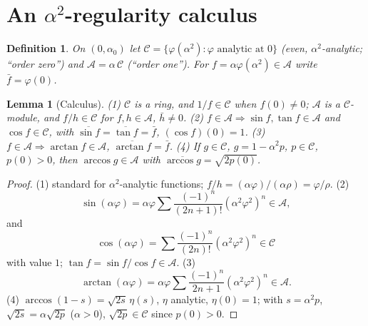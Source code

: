 \documentclass[pdflatex,sn-mathphys-num]{sn-jnl}
\theoremstyle{thmstyleone}%
\newtheorem{lemma}{Lemma}%
\theoremstyle{thmstyletwo}%
\theoremstyle{thmstylethree}%
\newtheorem{definition}{Definition}%
\begin{document}
\section{An \texorpdfstring{$\alpha^2$}{alpha2}-regularity calculus}
\begin{definition}
On $(0,\alpha_0)$ let $\mathcal C=\{\varphi(\alpha^2):\varphi\text{ analytic at }0\}$
(even, $\alpha^2$-analytic; ``order zero'') and $\mathcal A=\alpha\,\mathcal C$
(``order one''). For $f=\alpha\varphi(\alpha^2)\in\mathcal A$ write $\bar f=\varphi(0)$.
\end{definition}

\begin{lemma}[Calculus]\label{lem:calc}
\textup{(1)} $\mathcal C$ is a ring, and $1/f\in\mathcal C$ when $f(0)\neq0$;
$\mathcal A$ is a $\mathcal C$-module, and $f/h\in\mathcal C$ for $f,h\in\mathcal A$, $\bar h\neq0$.
\textup{(2)} $f\in\mathcal A\Rightarrow\sin f,\tan f\in\mathcal A$ and
$\cos f\in\mathcal C$, with $\overline{\sin f}=\overline{\tan f}=\bar f$,
$(\cos f)(0)=1$.
\textup{(3)} $f\in\mathcal A\Rightarrow\arctan f\in\mathcal A$,
$\overline{\arctan f}=\bar f$.
\textup{(4)} If $g\in\mathcal C$, $g=1-\alpha^2p$, $p\in\mathcal C$, $p(0)>0$, then $\arccos g\in\mathcal A$ with $\overline{\arccos g}=\sqrt{2p(0)}$.
\end{lemma}
\begin{proof}
(1) standard for $\alpha^2$-analytic functions; $f/h=(\alpha\varphi)/(\alpha\rho)=\varphi/\rho$.
(2)
\[
\sin(\alpha\varphi)=\alpha\varphi\sum\frac{(-1)^n}{(2n+1)!}(\alpha^2\varphi^2)^n\in\mathcal A,
\]
and
\[
\cos(\alpha\varphi)=\sum\frac{(-1)^n}{(2n)!}(\alpha^2\varphi^2)^n\in\mathcal C
\]
with value $1$;
$\tan f=\sin f/\cos f\in\mathcal A$.
(3)
\[
\arctan(\alpha\varphi)=\alpha\varphi\sum\frac{(-1)^n}{2n+1}(\alpha^2\varphi^2)^n\in\mathcal A.
\]
(4) $\arccos(1-s)=\sqrt{2s}\,\eta(s)$, $\eta$ analytic, $\eta(0)=1$; with $s=\alpha^2p$,
$\sqrt{2s}=\alpha\sqrt{2p}$ ($\alpha>0$), $\sqrt{2p}\in\mathcal C$ since $p(0)>0$.
\end{proof}
\end{document}
